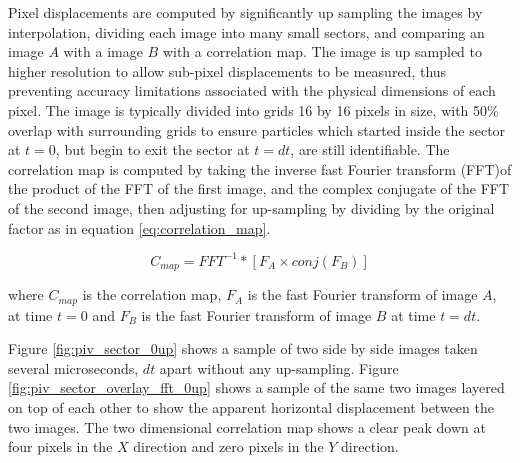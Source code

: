 Pixel displacements are computed by significantly up sampling the images by 
interpolation, dividing each image into many small sectors, and 
comparing an  image $A$ with a image $B$ with a correlation map. The image is 
up sampled to higher resolution to allow sub-pixel displacements to be 
measured, thus preventing accuracy limitations associated with the physical 
dimensions of each pixel. The image is typically divided into grids 16 by 16 
pixels in size, with 50\% overlap with surrounding grids to ensure particles 
which started inside the sector at $t=0$, but begin to exit the sector at 
$t=dt$, are still identifiable.  The correlation map is computed by taking the 
inverse fast Fourier transform (FFT)of the product of the FFT of the first 
image, and the complex conjugate of the FFT of the second image, then adjusting 
for up-sampling by dividing by the original factor as in equation 
\ref{eq:correlation_map}.

\begin{equation}
	C_{map} = FFT^{-1} * [F_A \times conj(F_B) ]
	\label{eq:correlation_map}
\end{equation}

where $C_{map}$ is the correlation map, $F_A$ is the fast Fourier transform of 
image $A$, at time $t=0$ and $F_B$ is the fast Fourier transform of image $B$ 
at time $t=dt$.

Figure \ref{fig:piv_sector_0up} shows a sample of two side by side images taken 
several microseconds, $dt$ apart without any up-sampling. Figure 
\ref{fig:piv_sector_overlay_fft_0up} shows a sample of the same two images 
layered on top of each other to show the apparent horizontal displacement 
between the two images. The two dimensional correlation map shows a clear peak 
down at four pixels in the $X$ direction and zero pixels in the $Y$ direction.


